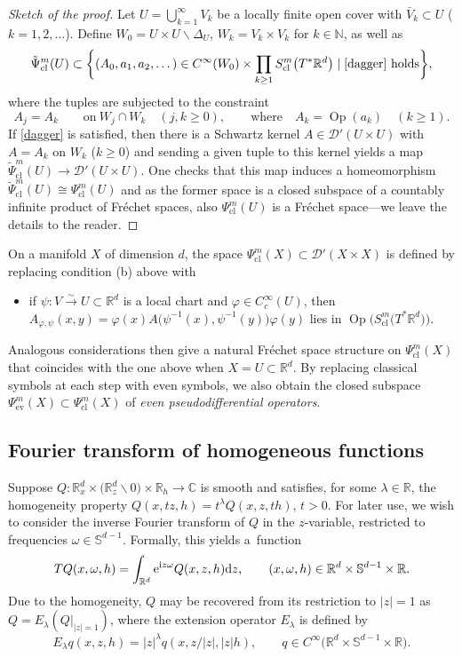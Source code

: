 \documentclass[10pt,a4paper]{amsart}
\numberwithin{equation}{section}
\theoremstyle{definition}
\newcommand{\R}{\mathbb{R}} %
\newcommand{\C}{\mathbb{C}} %
\newcommand{\ev}{\mathrm{ev}}
\newcommand{\1}{{\bf 1}}
\DeclareMathOperator{\Op}{Op}
\newcommand{\cl}{\mathrm{cl}}
\begin{document}
\begin{proof}[Sketch of the proof]
	Let $U=\bigcup_{k=1}^\infty V_k$ be a locally finite open cover with $\bar V_k\subset U$ ($k=1,2,\dots$). Define $W_0=U\times U\backslash \Delta_U$, $W_k=V_k\times V_k$ for $k\in \mathbb N$, as well as
	\[
		\tilde \Psi^m_\cl(U)\subset \bigg\{(A_0,a_1,a_2,\dots)\in C^\infty(W_0)\times \prod_{k\ge 1}S^m_\cl\bigl(T^*\R^d\bigr)\mid \eqref{dagger} \text{ holds}\bigg\},
	\]
	where the tuples are subjected to the constraint
	\begin{equation}\label{dagger}
		A_j=A_k \qquad\text{on}\  W_j\cap W_k \quad(j,k\ge 0),\qquad \text{where}\quad A_k = \Op(a_k)\quad(k\ge 1).
	\end{equation}
	If \eqref{dagger} is satisfied, then there is a Schwartz kernel $A\in \mathcal D'(U\times U)$ with $A=A_k$ on $W_k$ ($k\ge 0$)
	 and sending a given tuple to this kernel yields a map
$\tilde \Psi_\cl^m(U) \rightarrow \mathcal D'(U\times U)$.
	One checks that this map induces a homeomorphism $\tilde \Psi^m_\cl(U)\cong \Psi_\cl^m(U)$ and as the former space is a closed subspace of a countably infinite product of Fr{\'e}chet spaces, also $\Psi^m_\cl(U)$ is a Fr{\'e}chet space---we leave the details to the reader.
\end{proof}

On a manifold $X$ of dimension $d$, the space $\Psi^m_\cl(X)\subset \mathcal D'(X\times X)$ is defined by replacing condition (b) above with
\begin{itemize}\itemsep=0pt
	\item[(b$'$)] if $\psi\colon V\xrightarrow{\sim} U\subset \R^d$ is a local chart and $\varphi\in C_c^\infty(U)$, then $A_{\varphi,\psi}(x,y) = \varphi(x) A\bigl(\psi^{-1}(x),\allowbreak\psi^{-1}(y)\bigr) \varphi(y)$ lies in $\Op\bigl(S^m_\cl\bigl(T^*\R^d\bigr)\bigr)$.
\end{itemize}
Analogous considerations then give a natural Fr{\'e}chet space structure on $\Psi^m_\cl(X)$ that coincides with the one above when $X=U\subset \R^d$. By replacing classical symbols at each step with even symbols, we also obtain the closed subspace $\Psi^m_\ev(X)\subset\Psi^m_\cl(X)$ of {\it even pseudodifferential operators}.



\subsection{Fourier transform of homogeneous functions}
Suppose $Q\colon \R^d_x\times \bigl(\R^d_z\backslash 0\bigr) \times \R_h\rightarrow \C$ is smooth and satisfies, for some $\lambda\in \R$, the homogeneity property
$Q(x,tz,h)=t^\lambda Q(x,z,th)$, $ t>0$.
For later use, we wish to consider the inverse Fourier transform of $Q$ in the $z$-variable, restricted to frequencies $\omega \in \mathbb S^{d-1}$. Formally, this yields a~function
\[
	T Q(x,\omega,h)=\int_{\R^d} {\rm e}^{{\rm i}z\omega} Q(x,z,h) {\rm d}z,\qquad (x,\omega,h)\in \R^d\times \mathbb S^{d-1}\times \R.
\]
Due to the homogeneity, $Q$ may be recovered from its restriction to $|z|=1$ as $Q=E_\lambda(Q|_{|z|=1})$, where the extension operator $E_\lambda$ is defined by
\[
	E_\lambda q(x,z,h)=|z|^\lambda q(x,z/|z|,|z|h),\qquad q\in C^\infty\bigl(\R^d\times \mathbb S^{d-1}\times \R\bigr).
\]
\end{document}
